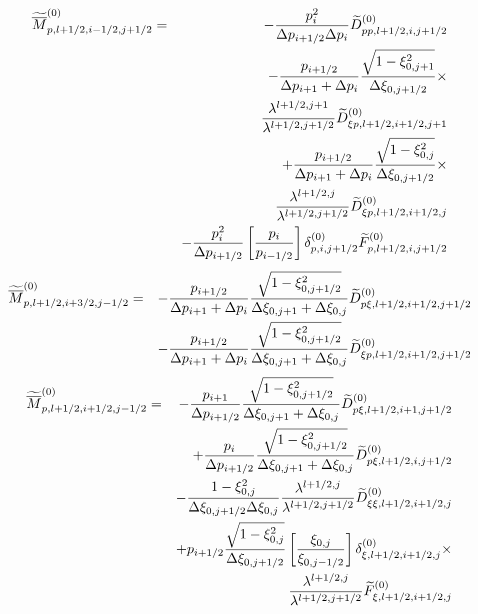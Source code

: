 \begin{eqnarray}
\widetilde{\overline{M}}_{p,l+1/2,i-1/2,j+1/2}^{\left( 0\right) } &=&-\frac{%
p_{i}^{2}}{\Delta p_{i+1/2}\Delta p_{i}}\widetilde{D}_{pp,l+1/2,i,j+1/2}^{%
\left( 0\right) }  \nonumber \\
&&-\frac{p_{i+1/2}}{\Delta p_{i+1}+\Delta p_{i}}\frac{\sqrt{1-\xi
_{0,j+1}^{2}}}{\Delta \xi _{0,j+1/2}}\times   \nonumber \\
&&\frac{\lambda ^{l+1/2,j+1}}{\lambda ^{l+1/2,j+1/2}}\widetilde{D}_{\xi
p,l+1/2,i+1/2,j+1}^{\left( 0\right) }  \nonumber \\
&&+\frac{p_{i+1/2}}{\Delta p_{i+1}+\Delta p_{i}}\frac{\sqrt{1-\xi _{0,j}^{2}}%
}{\Delta \xi _{0,j+1/2}}\times   \nonumber \\
&&\frac{\lambda ^{l+1/2,j}}{\lambda ^{l+1/2,j+1/2}}\widetilde{D}_{\xi
p,l+1/2,i+1/2,j}^{\left( 0\right) }  \nonumber \\
&&-\frac{p_{i}^{2}}{\Delta p_{i+1/2}}\left[ \frac{p_{i}}{p_{i-1/2}}\right]
\delta _{p,i,j+1/2}^{\left( 0\right) }\widetilde{F}_{p,l+1/2,i,j+1/2}^{%
\left( 0\right) }\nonumber \\
\end{eqnarray}
\begin{eqnarray}
\widetilde{\overline{M}}_{p,l+1/2,i+3/2,j-1/2}^{\left( 0\right) } &=&-\frac{%
p_{i+1/2}}{\Delta p_{i+1}+\Delta p_{i}}\frac{\sqrt{1-\xi _{0,j+1/2}^{2}}}{%
\Delta \xi _{0,j+1}+\Delta \xi _{0,j}}\widetilde{D}_{p\xi
,l+1/2,i+1/2,j+1/2}^{\left( 0\right) }  \nonumber \\
&&-\frac{p_{i+1/2}}{\Delta p_{i+1}+\Delta p_{i}}\frac{\sqrt{1-\xi
_{0,j+1/2}^{2}}}{\Delta \xi _{0,j+1}+\Delta \xi _{0,j}}\widetilde{D}_{\xi
p,l+1/2,i+1/2,j+1/2}^{\left( 0\right) }\nonumber \\
\end{eqnarray}
\begin{eqnarray}
\widetilde{\overline{M}}_{p,l+1/2,i+1/2,j-1/2}^{\left( 0\right) } &=&-\frac{%
p_{i+1}}{\Delta p_{i+1/2}}\frac{\sqrt{1-\xi _{0,j+1/2}^{2}}}{\Delta \xi
_{0,j+1}+\Delta \xi _{0,j}}\widetilde{D}_{p\xi ,l+1/2,i+1,j+1/2}^{\left(
0\right) }  \nonumber \\
&&+\frac{p_{i}}{\Delta p_{i+1/2}}\frac{\sqrt{1-\xi _{0,j+1/2}^{2}}}{\Delta %
\xi _{0,j+1}+\Delta \xi _{0,j}}\widetilde{D}_{p\xi ,l+1/2,i,j+1/2}^{\left(
0\right) }  \nonumber \\
&&-\frac{1-\xi _{0,j}^{2}}{\Delta \xi _{0,j+1/2}\Delta \xi _{0,j}}\frac{%
\lambda ^{l+1/2,j}}{\lambda ^{l+1/2,j+1/2}}\widetilde{D}_{\xi \xi
,l+1/2,i+1/2,j}^{\left( 0\right) }  \nonumber \\
&&+p_{i+1/2}\frac{\sqrt{1-\xi _{0,j}^{2}}}{\Delta \xi _{0,j+1/2}}\left[
\frac{\xi _{0,j}}{\xi _{0,j-1/2}}\right] \delta _{\xi
,l+1/2,i+1/2,j}^{\left( 0\right) }\times   \nonumber \\
&&\frac{\lambda ^{l+1/2,j}}{\lambda ^{l+1/2,j+1/2}}\widetilde{F}_{\xi
,l+1/2,i+1/2,j}^{\left( 0\right) }\nonumber \\
\end{eqnarray}
